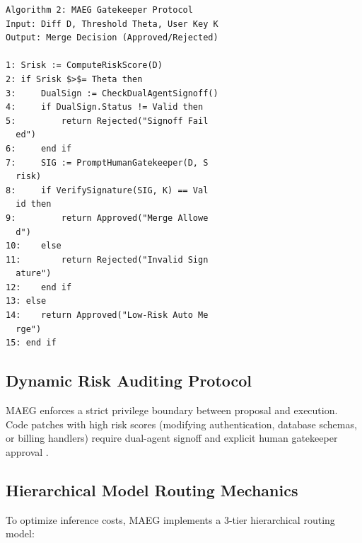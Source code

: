 \documentclass[10pt,journal,compsoc,twocolumn]{IEEEtran}
\begin{document}
\begin{scriptsize}
\begin{verbatim}
Algorithm 2: MAEG Gatekeeper Protocol
Input: Diff D, Threshold Theta, User Key K
Output: Merge Decision (Approved/Rejected)

1: Srisk := ComputeRiskScore(D)
2: if Srisk $>$= Theta then
3:     DualSign := CheckDualAgentSignoff()
4:     if DualSign.Status != Valid then
5:         return Rejected("Signoff Fail
  ed")
6:     end if
7:     SIG := PromptHumanGatekeeper(D, S
  risk)
8:     if VerifySignature(SIG, K) == Val
  id then
9:         return Approved("Merge Allowe
  d")
10:    else
11:        return Rejected("Invalid Sign
  ature")
12:    end if
13: else
14:    return Approved("Low-Risk Auto Me
  rge")
15: end if
\end{verbatim}
\end{scriptsize}



\subsection{Dynamic Risk Auditing Protocol}

MAEG enforces a strict privilege boundary between proposal and execution. Code patches with high risk scores (modifying authentication, database schemas, or billing handlers) require dual-agent signoff and explicit human gatekeeper approval \cite{joshua2026adoptiondepth}.


\subsection{Hierarchical Model Routing Mechanics}

To optimize inference costs, MAEG implements a 3-tier hierarchical routing model:
\end{document}
